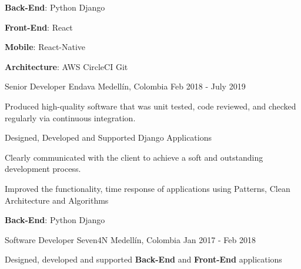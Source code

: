 \begin{cventries}
{\begin{cvitems}
        \item {\textbf{Back-End}: Python {\dotsep}  {\dotsep} Django {\dotsep} }
        \item {\textbf{Front-End}: React {\dotsep} }
        \item {\textbf{Mobile}: React-Native {\dotsep} }
        \item {\textbf{Architecture}: AWS {\dotsep}  {\dotsep} CircleCI {\dotsep}  {\dotsep} Git {\dotsep} }
      \end{cvitems}
      \begin{cvsubentries}
      \end{cvsubentries}
    }
  \cventry
    {Senior Developer}
    {Endava}
    {Medellín, Colombia}
    {Feb 2018 - July 2019}
    {
      \begin{cvitems}
        \item {Produced high-quality software that was unit tested, code reviewed, and checked regularly via continuous integration.}
        \item {Designed, Developed and Supported Django Applications}
        \item {Clearly communicated with the client to achieve a soft and outstanding development process.}
        \item {Improved the functionality, time response of applications using Patterns, Clean Architecture and Algorithms}
        \item {\textbf{Back-End}: Python {\dotsep}  {\dotsep} Django {\dotsep} }
      \end{cvitems}
      \begin{cvsubentries}
      \end{cvsubentries}
    }
  \cventry
    {Software Developer}
    {Seven4N}
    {Medellín, Colombia}
    {Jan 2017 - Feb 2018}
    {
      \begin{cvitems}
        \item {Designed, developed and supported \textbf{Back-End} and \textbf{Front-End} applications}

\end{cvitems}}
\end{cventries}
